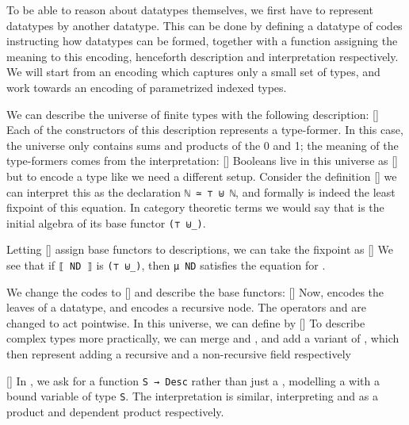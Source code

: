To be able to reason about datatypes themselves, we first have to represent datatypes by another datatype.
This can be done by defining a datatype of codes instructing how datatypes can be formed, together with a function assigning the meaning to this encoding, henceforth description and interpretation respectively. We will start from an encoding which captures only a small set of types, and work towards an encoding of parametrized indexed types.


We can describe the universe of finite types with the following description:
[]
Each of the constructors of this description represents a type-former. In this case, the universe only contains sums and products of the 0 and 1; the meaning of the type-formers comes from the interpretation:
[]
Booleans live in this universe as
[]
but to encode a type like \bN{} we need a different setup. Consider the definition
[]
we can interpret this as the declaration \texttt{ℕ ≃ ⊤ ⊎ ℕ}, and formally  is indeed the least fixpoint of this equation. In category theoretic terms we would say that  is the initial algebra of its base functor \texttt{(⊤ ⊎\_)}.
 
Letting
[]
assign base functors to descriptions, we can take the fixpoint as
[]
We see that if \texttt{⟦ ND ⟧} is \texttt{(⊤ ⊎\_)}, then \texttt{μ ND} satisfies the equation for .

We change the codes to
[]
and describe the base functors:
[]
Now,  encodes the leaves of a datatype, and  encodes a recursive node. The operators  and  are changed to act pointwise. 
In this universe, we can define  by
[]
To describe complex types more practically, we can merge  and , and add a variant  of , which then represent adding a recursive and a non-recursive field respectively

[]
In , we ask for a function \texttt{S → Desc} rather than just a , modelling a  with a bound variable of type \texttt{S}. The interpretation is similar, interpreting  and  as a product and dependent product respectively.


